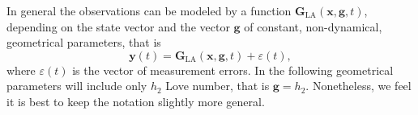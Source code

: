 \documentclass[pdflatex,sn-mathphys-num]{sn-jnl}%
\theoremstyle{thmstyleone}%
\theoremstyle{thmstyletwo}%
\theoremstyle{thmstylethree}%
\renewcommand{\vec}[1]{\boldsymbol{#1}}
\begin{document}
% 
In general the observations  can be modeled by a function $\vec{G}_{\mathrm{LA}}(\vec{x}, \vec{g}, t )$, depending on the state vector and the vector $\vec{g}$ of constant, non-dynamical, geometrical parameters, that is
%
\begin{equation}\label{Y_eq1}
	\vec{y}(t) = \vec{G}_{\mathrm{LA}}(\vec{x}, \vec{g}, t ) + \varepsilon(t), %
\end{equation}
%
where 
$\varepsilon(t)$ is the vector of measurement errors.
In the following geometrical parameters will include only $h_2$ Love number, that is $\vec{g} = h_2$. Nonetheless, we feel it is best to keep the notation slightly more general.
	
\end{document}

